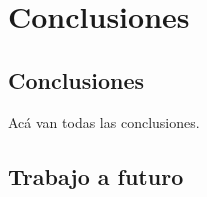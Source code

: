 \chapter{Conclusiones}

\section{Conclusiones}

Acá van todas las conclusiones.

\section{Trabajo a futuro}
